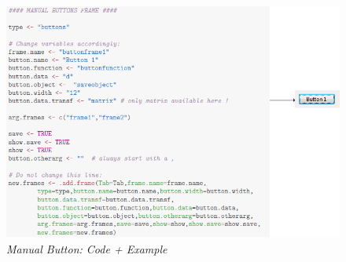 \documentclass[a4paper]{article}\usepackage[]{graphicx}\usepackage[]{color}
\begin{document}
\begin{figure}[H]
\centering
\includegraphics[scale=0.5]{figures/manualbutton.png}
\caption{{\it Manual Button: Code + Example}
\label{manualbutton}}
\end{figure}
\end{document}
